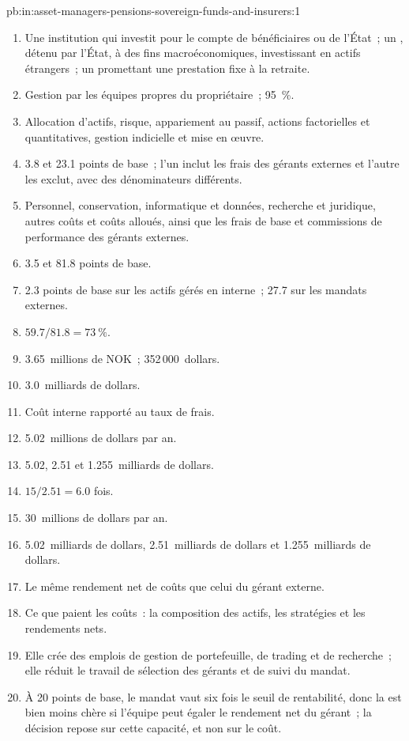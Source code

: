 \begin{solution}{pb:in:asset-managers-pensions-sovereign-funds-and-insurers:1}
\begin{enumerate}
\item Une institution qui investit pour le compte de bénéficiaires ou de l'État~; un , détenu par l'État, à des fins macroéconomiques, investissant en actifs
étrangers~; un  promettant une prestation fixe à la retraite.
\item Gestion par les équipes propres du propriétaire~; 95~\%.
\item Allocation d'actifs, risque, appariement au passif, actions factorielles et quantitatives, gestion indicielle et mise en œuvre.
\item 3.8 et 23.1 points de base~; l'un inclut les frais des gérants externes et l'autre les exclut, avec des
dénominateurs différents.
\item Personnel, conservation, informatique et données, recherche et juridique, autres coûts et coûts alloués, ainsi que les frais de base et
commissions de performance des gérants externes.
\item 3.5 et 81.8 points de base.
\item 2.3 points de base sur les actifs gérés en interne~; 27.7 sur les mandats externes.
\item $59.7/81.8=73~\%$.
\item 3.65~millions de NOK~; 352\,000~dollars.
\item 3.0~milliards de dollars.
\item Coût interne rapporté au taux de frais.
\item 5.02~millions de dollars par an.
\item 5.02, 2.51 et 1.255~milliards de dollars.
\item $15/2.51=6.0$ fois.
\item 30~millions de dollars par an.
\item 5.02~milliards de dollars, 2.51~milliards de dollars et 1.255~milliards de dollars.
\item Le même rendement net de coûts que celui du gérant externe.
\item Ce que paient les coûts~: la composition des actifs, les stratégies et les rendements nets.
\item Elle crée des emplois de gestion de portefeuille, de trading et de recherche~; elle réduit le travail de sélection des gérants et de suivi du
mandat.
\item À 20 points de base, le mandat vaut six fois le seuil de rentabilité, donc la  est bien moins chère si l'équipe peut
égaler le rendement net du gérant~; la décision repose sur cette capacité, et non sur le coût.
\end{enumerate}
\end{solution}


